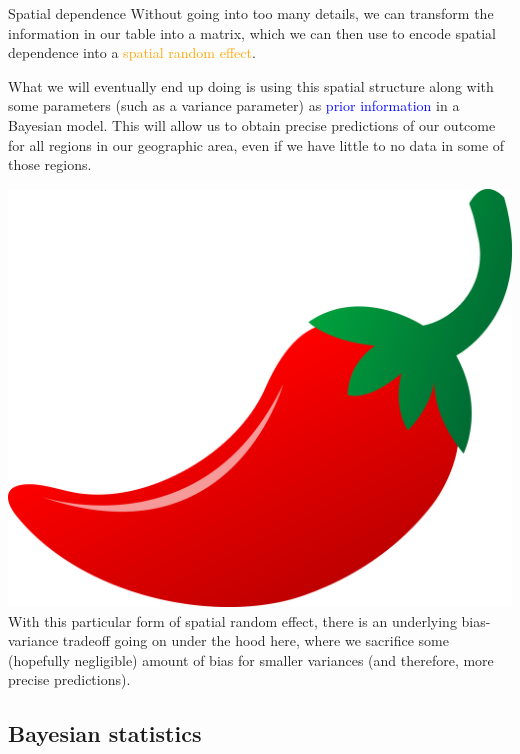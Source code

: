 \documentclass[10pt,t]{beamer}
\begin{document}
\begin{frame}{Spatial dependence}
Without going into too many details, we can transform the information in our table into a matrix, which we can then use to encode spatial dependence into a \textcolor{orange}{spatial random effect}.

\vspace{0.3cm}

What we will eventually end up doing is using this spatial structure along with some parameters (such as a variance parameter) as \textcolor{blue}{prior information} in a Bayesian model. This will allow us to obtain precise predictions of our outcome for all regions in our geographic area, even if we have little to no data in some of those regions.

\vspace{0.3cm}

\includegraphics[scale=0.01]{chilipepper.png} With this particular form of spatial random effect, there is an underlying bias-variance tradeoff going on under the hood here, where we sacrifice some (hopefully negligible) amount of bias for smaller variances (and therefore, more precise predictions).

\end{frame}

\subsection{Bayesian statistics}
\end{document}
